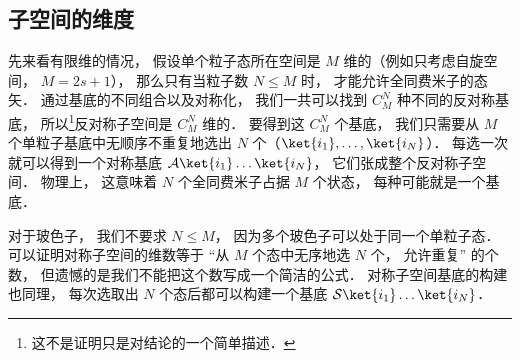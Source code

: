 \subsection{子空间的维度}
先来看有限维的情况， 假设单个粒子态所在空间是 $M$ 维的（例如只考虑自旋空间， $M = 2s+1$）， 那么只有当粒子数 $N \le M$ 时， 才能允许全同费米子的态矢． 通过基底的不同组合以及对称化， 我们一共可以找到 $C_M^N$ 种不同的反对称基底， 所以\footnote{这不是证明只是对结论的一个简单描述．}反对称子空间是 $C_M^N$ 维的． 要得到这 $C_M^N$ 个基底， 我们只需要从 $M$ 个单粒子基底中无顺序不重复地选出 $N$ 个（$\ket{i_1}, \dots, \ket{i_N}$）． 每选一次就可以得到一个对称基底 $\mathcal A \ket{i_1}\dots\ket{i_N}$， 它们张成整个反对称子空间． 物理上， 这意味着 $N$ 个全同费米子占据 $M$ 个状态， 每种可能就是一个基底．

对于玻色子， 我们不要求 $N \le M$， 因为多个玻色子可以处于同一个单粒子态． 可以证明对称子空间的维数等于 “从 $M$ 个态中无序地选 $N$ 个， 允许重复” 的个数， 但遗憾的是我们不能把这个数写成一个简洁的公式． 对称子空间基底的构建也同理， 每次选取出 $N$ 个态后都可以构建一个基底 $\mathcal S \ket{i_1}\dots\ket{i_N}$．
